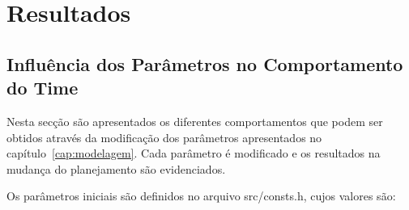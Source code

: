 \chapter{Resultados}\label{cap:resultados}

\section{Influência dos Parâmetros no Comportamento do Time}

Nesta secção são apresentados os diferentes comportamentos
que podem ser obtidos através da modificação dos parâmetros
apresentados no capítulo~\ref{cap:modelagem}. Cada parâmetro
é modificado e os resultados na mudança do planejamento são
evidenciados.

Os parâmetros iniciais são definidos no arquivo src/consts.h, %
cujos valores são:

